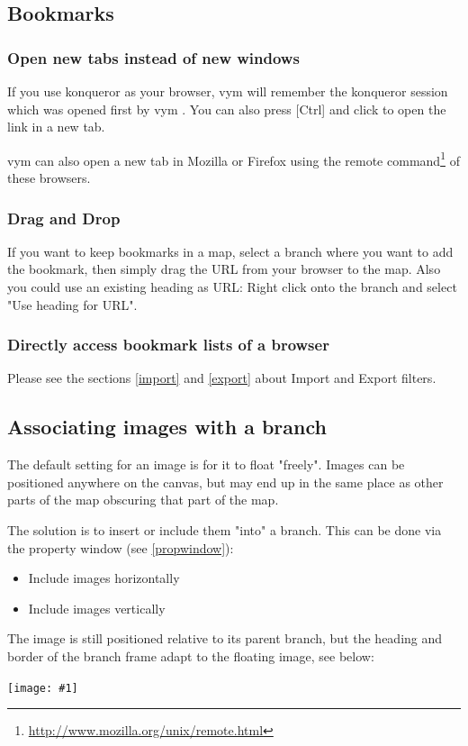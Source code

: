 \documentclass[12pt,a4paper]{article}
\newcommand{\maximage}[1]{  
    \begin{center}
        \texttt{[image: \#1]} 
    \end{center}
}
\newcommand{\vym}{{\sc vym }}
\newcommand{\key}[1]{[#1]}
\begin{document}
\subsection{Bookmarks} \label{bookmarks}
\subsubsection*{Open new tabs instead of new windows}
If you use konqueror as your browser, \vym will remember the konqueror session which
was opened first by \vym. You can also press \key{Ctrl} and click to
open the link in a new tab.

\vym can also open a new tab in Mozilla or Firefox using the remote
command\footnote{
    \href{http://www.mozilla.org/unix/remote.html}{http://www.mozilla.org/unix/remote.html}}
of these browsers.

\subsubsection*{Drag and Drop}
If you want to keep bookmarks in a map, select a branch where you want
to add the bookmark, then simply drag the URL from your browser to the
map. Also you could use an existing heading as URL: Right click onto the
branch and select "Use heading for URL".


\subsubsection*{Directly access bookmark lists of a browser}
Please see the sections \ref{import} and \ref{export} about
Import and Export filters.

\subsection{Associating images with a branch} \label{incimg}
The default setting for an image is for it to float "freely". Images can
be positioned anywhere on the canvas, but may end up in the same place
as other parts of the map obscuring that part of the map.

The solution is to insert or include them "into" a branch. This can be
done via the property window (see \ref{propwindow}):
\begin{itemize}
    \item Include images horizontally
    \item Include images vertically
\end{itemize}
The image is still positioned relative to its parent branch, but the
heading and border of the branch frame adapt to the floating image, see
below: \maximage{images/includeImages.png}
\end{document}
